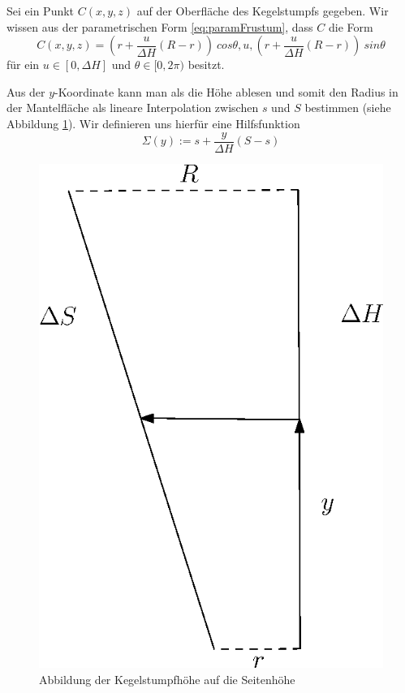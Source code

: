 Sei ein Punkt $C(x,y,z)$ auf der Oberfläche des Kegelstumpfs gegeben. Wir wissen aus der parametrischen Form \ref{eq:paramFrustum}, dass $C$ die Form
\[
C(x,y,z) = (r + \frac{u}{\Delta H} (R - r))~cos \theta, u, (r + \frac{u}{\Delta H} (R - r))~sin \theta
\]  für ein $u\in [0, \Delta H]$ und $\theta \in [0, 2\pi)$ besitzt. 

Aus der $y$-Koordinate kann man als die Höhe ablesen und somit den Radius in der Mantelfläche als lineare Interpolation zwischen $s$ und $S$ bestimmen (siehe Abbildung \ref{fig:mapToLateralS}). Wir definieren uns hierfür eine Hilfsfunktion 
\begin{equation} \label{eq:Sigma}
	\Sigma(y) := s + \frac{y}{\Delta H} (S-s)
\end{equation}


\begin{figure}[!htb]
	\centering
	\includegraphics[scale=.7]{images/mapToLateralS.eps}
	\caption{Abbildung der Kegelstumpfhöhe auf die Seitenhöhe}
	\label{fig:mapToLateralS}
\end{figure}

